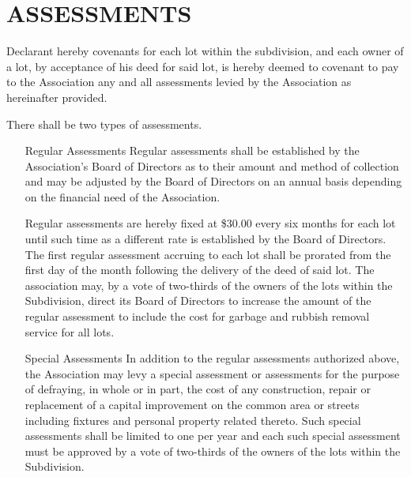\documentclass[10pt, letterpaper]{article}
\begin{document}
\section{ASSESSMENTS}
Declarant hereby covenants for each lot within the subdivision, and each owner of a lot, by acceptance of his deed for said lot, is hereby deemed to covenant to pay to the Association any and all assessments levied by the Association as hereinafter provided.

There shall be two types of assessments.

\begin{enumerate}
  \item[Regular Assessments] Regular assessments shall be established by the Association's Board of Directors as to their amount and method of collection and may be adjusted by the Board of Directors on an annual basis depending on the financial need of the Association.

    Regular assessments are hereby fixed at \$30.00 every six months for each lot until such time as a different rate is established by the Board of Directors.
    The first regular assessment accruing to each lot shall be prorated from the first day of the month following the delivery of the deed of said lot.
    The association may, by a vote of two-thirds of the owners of the lots within the Subdivision, direct its Board of Directors to increase the amount of the regular assessment to include the cost for garbage and rubbish removal service for all lots.
  \item[Special Assessments] In addition to the regular assessments authorized above, the Association may levy a special assessment or assessments for the purpose of defraying, in whole or in part, the cost of any construction, repair or replacement of a capital improvement on the common area or streets including fixtures and personal property related thereto.
    Such special assessments shall be limited to one per year and each such special assessment must be approved by a vote of two-thirds of the owners of the lots within the Subdivision.


\end{enumerate}
\end{document}
